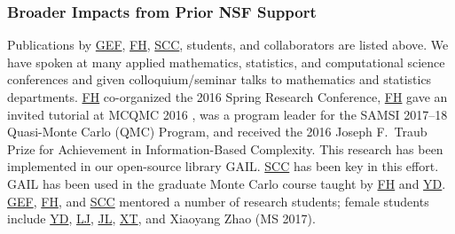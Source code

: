 \documentclass[11pt]{NSFamsart}
\newcommand{\FH}{\hyperlink{FHlink}{FH}\xspace}
\newcommand{\SCTC}{\hyperlink{SCTClink}{SCC}\xspace}
\newcommand{\GEF}{\hyperlink{GEFlink}{GEF}\xspace}
\newcommand{\YD}{\hyperlink{YDlink}{YD}\xspace}
\newcommand{\LJ}{\hyperlink{LJlink}{LJ}\xspace}
\newcommand{\XT}{\hyperlink{XTlink}{XT}\xspace}
\newcommand{\JL}{\hyperlink{JLlink}{JL}\xspace}
\newcommand{\GAIL}{GAIL\xspace}
\begin{document}
\subsubsection{Broader Impacts from Prior NSF Support} \label{prevBIsect}
Publications by \GEF, \FH,  \SCTC, students, and collaborators are listed above.  We have spoken at many applied mathematics, statistics,
and computational science conferences and given colloquium/seminar talks to mathematics and
statistics departments.  \FH co-organized the
2016 Spring Research
Conference, \FH gave an invited tutorial
at MCQMC 2016
\cite{Hic17a}, was a program leader for the SAMSI 2017--18 Quasi-Monte Carlo (QMC) Program, and received the 2016 Joseph F.\ Traub Prize for Achievement in Information-Based Complexity.  This research has been implemented in our open-source library
\GAIL \cite{ChoEtal21a}.  \SCTC has been key in this effort.  \GAIL has been used in the graduate Monte Carlo course taught by \FH and \YD. \GEF, \FH, and \SCTC mentored a number of
research students;  female students include \YD, \LJ, \JL, \XT, and Xiaoyang Zhao (MS 2017).

\fi 

\end{document}
